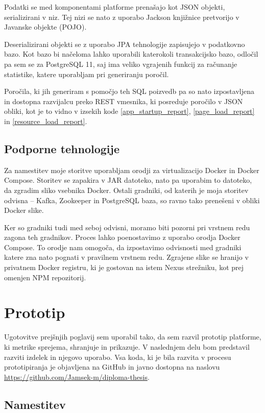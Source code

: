 \documentclass[a4paper, 12pt]{book}
\begin{document}
Podatki se med komponentami platforme prenašajo kot JSON objekti, serializirani v niz. Tej nizi se  nato z uporabo Jackson knjižnice pretvorijo v Javanske objekte (POJO).

Deserializirani objekti se z uporabo JPA tehnologije zapisujejo v podatkovno bazo. Kot bazo bi načeloma lahko uporabili katerokoli transakcijsko bazo, odločil pa sem se za PostgreSQL 11, saj ima veliko vgrajenih funkcij za računanje statistike, katere uporabljam pri generiranju poročil.

Poročila, ki jih generiram s pomočjo teh SQL poizvedb pa so nato izpostavljena in dostopna razvijalcu preko REST vmesnika, ki posreduje poročilo v JSON obliki, kot je to vidno v izsekih kode \ref{app_startup_report}, \ref{page_load_report} in \ref{resource_load_report}.

\subsection{Podporne tehnologije}
\label{ch3:sec2:sub3}

Za namestitev moje storitve uporabljam orodji za virtualizacijo Docker in Docker Compose. Storitev se zapakira v JAR datoteko, nato pa uporabim to datoteko, da zgradim sliko vsebnika Docker. Ostali gradniki, od katerih je moja storitev odvisna -- Kafka, Zookeeper in PostgreSQL baza, so ravno tako prenešeni v obliki Docker slike.

Ker so gradniki tudi med seboj odvisni, moramo biti pozorni pri vrstnem redu zagona teh gradnikov. Proces lahko poenostavimo z uporabo orodja Docker Compose. To orodje nam omogoča, da izpostavimo odvisnosti med gradniki katere zna nato pognati v pravilnem vrstnem redu. Zgrajene slike se hranijo v privatnem Docker registru, ki je gostovan na istem Nexus strežniku, kot prej omenjen NPM repozitorij.

\section{Prototip}
\label{ch3:sec3}

Ugotovitve prejšnjih poglavij sem uporabil tako, da sem razvil prototip platforme, ki metrike sprejema, shranjuje in prikazuje. V naslednjem delu bom predstavil razviti izdelek in njegovo uporabo. Vsa koda, ki je bila razvita v procesu prototipiranja je objavljena na GitHub in javno dostopna na naslovu \url{https://github.com/Jamsek-m/diploma-thesis}.

\subsection{Namestitev}
\label{ch3:sec3:sub1}
\end{document}
